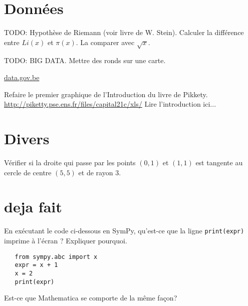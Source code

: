 
\section{Données}

\begin{exercice}
    TODO: Hypothèse de Riemann (voir livre de W. Stein).
    Calculer la différence entre $Li(x)$ et $\pi(x)$. La comparer avec
    $\sqrt{x}$.
\end{exercice}

\begin{exercice}
    TODO: BIG DATA. Mettre des ronds sur une carte.
\end{exercice}

\begin{exercice}
    \url{data.gov.be}
\end{exercice}

\begin{exercice}
Refaire le premier graphique de l'Introduction du livre de Pikkety.
\url{http://piketty.pse.ens.fr/files/capital21c/xls/}
Lire l'introduction ici...
\end{exercice}

\section*{Divers}

\begin{exercice}
    Vérifier si la droite qui passe par les points $(0,1)$ et $(1,1)$ est
    tangente au cercle de centre $(5,5)$ et de rayon $3$.
\end{exercice}

\section{deja fait}

\begin{exercice}
En exécutant le code ci-dessous en SymPy, qu'est-ce que la ligne
\texttt{print(expr)} imprime à l'écran ? Expliquer pourquoi.
\begin{verbatim}
   from sympy.abc import x
   expr = x + 1
   x = 2
   print(expr)
\end{verbatim}
Est-ce que Mathematica se comporte de la même façon?
\end{exercice}

